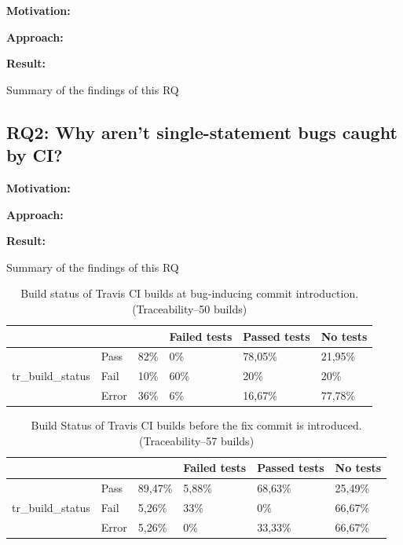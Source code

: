 \documentclass[10pt,conference]{IEEEtran}
\newcommand{\conclusion}[1]{\begin{center}\begin{tcolorbox}[skin=widget, left=0.5mm,right=0.5mm,top=0.5mm,bottom=0.5mm,boxrule=0.3mm,arc=0mm,coltitle=black,colframe=black!99!white,colback=white!88!gray,width=(\linewidth),before=\hfill,after=\hfill]#1\end{tcolorbox}\end{center}}
\newcommand{\rqii}{RQ2: Why aren't single-statement bugs caught by CI?}
\begin{document}
\noindent\textbf{Motivation:}

\noindent\textbf{Approach:}

\noindent\textbf{Result:}

\conclusion{Summary of the findings of this RQ}

\subsection*{\rqii}

\noindent\textbf{Motivation:}


\noindent\textbf{Approach:}


\noindent\textbf{Result:}

\conclusion{Summary of the findings of this RQ}

\begin{table}[t]
\centering
\begin{tabular}{lll|lll}
\hline
\multicolumn{3}{l|}{}                                      & Failed tests & Passed tests & No tests \\ \hline
\multirow{3}{*}{tr\_build\_status} & Pass  & 82\% & 0\%          & 78,05\%      & 21,95\%  \\
                                            & Fail  & 10\% & 60\%         & 20\%         & 20\%     \\
                                            & Error & 36\% & 6\%          & 16,67\%      & 77,78\%  \\ \hline
\end{tabular}
\label{tab:bugintro}
\caption{Build status of Travis CI builds at bug-inducing commit introduction. \\ (Traceability--50 builds)}
\end{table}

\begin{table}[t]
\centering
\begin{tabular}{lll|lll}
\hline
\multicolumn{3}{l|}{}                                & Failed tests & Passed tests & No tests \\ \hline
\multirow{3}{*}{tr\_build\_status} & Pass  & 89,47\% & 5,88\%       & 68,63\%      & 25,49\%  \\
                                   & Fail  & 5,26\%  & 33\%         & 0\%          & 66,67\%  \\
                                   & Error & 5,26\%  & 0\%          & 33,33\%      & 66,67\%  \\ \hline
\end{tabular}
\label{tab:beforefix}
\caption{Build Status of Travis CI builds before the fix commit is introduced. \\ (Traceability--57 builds)}
\end{table}
\end{document}

